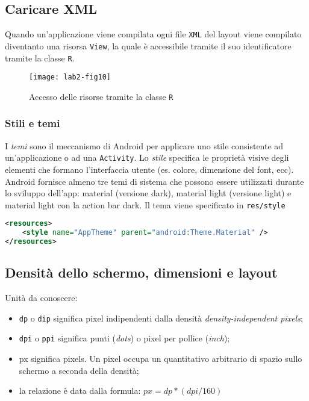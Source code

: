 \subsection{Caricare XML}

Quando un'applicazione viene compilata ogni file \texttt{XML} del layout viene compilato diventanto una risorsa \texttt{View}, la quale è accessibile tramite il suo identificatore tramite la classe \texttt{R}.

\begin{figure*}[htbp]
	\centering
	\texttt{[image: lab2-fig10]}
	\caption[Accesso risorse R]{Accesso delle risorse tramite la classe \texttt{R}}
	\label{img:lab2-fig10}
\end{figure*}

\subsubsection{Stili e temi}

I \textit{temi} sono il meccanismo di Android per applicare uno stile consistente ad un'applicazione o ad una \texttt{Activity}. Lo \textit{stile} specifica le proprietà visive degli elementi che formano l'interfaccia utente (es. colore, dimensione del font, ecc).
Android fornisce almeno tre temi di sistema che possono essere utilizzati durante lo sviluppo dell'app: material (versione dark), material light (versione light) e material light con la action bar dark. Il tema viene specificato in \texttt{res/style}

\begin{lstlisting}[language=XML, basicstyle=\footnotesize]
<resources>
	<style name="AppTheme" parent="android:Theme.Material" />
</resources>
\end{lstlisting}

\subsection{Densità dello schermo, dimensioni e layout}

Unità da conoscere:
\begin{itemize}
\item \texttt{dp} o \texttt{dip} significa pixel indipendenti dalla densità \textit{density-independent pixels};
\item \texttt{dpi} o \texttt{ppi} significa punti (\textit{dots}) o pixel per pollice (\textit{inch});
\item px significa pixels. Un pixel occupa un quantitativo arbitrario di spazio sullo schermo a seconda della densità;
\item la relazione è data dalla formula: $px = dp * (dpi/160)$
\end{itemize}

